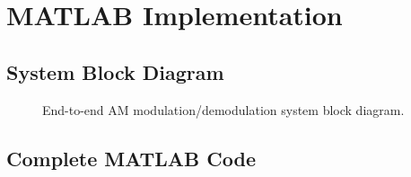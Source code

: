 \documentclass[12pt,a4paper]{article}
\begin{document}
\section{MATLAB Implementation}

\subsection{System Block Diagram}

\begin{figure}[H]
  \centering
  \caption{End-to-end AM modulation/demodulation system block diagram.}
  \label{fig:blockdiag}
\end{figure}

\subsection{Complete MATLAB Code}
\end{document}
